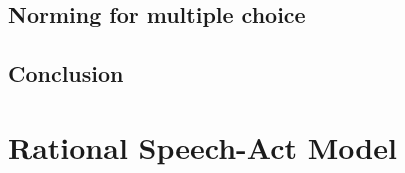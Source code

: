 \documentclass[a4paper,man,floatsintext,natbib,donotrepeattitle]{apa6}
\newcommand{\ek}[1]{\textcolor{Orange}{[ek: #1]}}
\begin{document}

\subsection{Norming for multiple choice}


\subsection{Conclusion}


\section{Rational Speech-Act Model}



\vfill
\pagebreak
\end{document}
